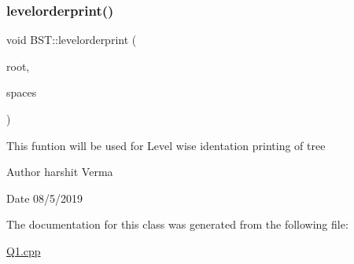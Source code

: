 \subsubsection{\texorpdfstring{levelorderprint()}{levelorderprint()}}
{\footnotesize\ttfamily void B\+S\+T\+::levelorderprint (\begin{DoxyParamCaption}\item[{\hyperlink{classBSTnode}{B\+S\+Tnode} $\ast$}]{root,  }\item[{int}]{spaces }\end{DoxyParamCaption})\hspace{0.3cm}{\ttfamily [inline]}}

This funtion will be used for Level wise identation printing of tree \begin{DoxyAuthor}{Author}
harshit Verma 
\end{DoxyAuthor}
\begin{DoxyDate}{Date}
08/5/2019 
\end{DoxyDate}


The documentation for this class was generated from the following file\+:\begin{DoxyCompactItemize}
\item 
\hyperlink{Q1_8cpp}{Q1.\+cpp}\end{DoxyCompactItemize}
